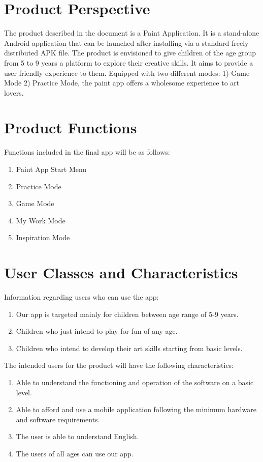 \documentclass{scrreprt}
\begin{document}
\section{Product Perspective}
The product described in the document is a Paint Application. It is a stand-alone Android application that can be launched after installing via a standard freely-distributed APK file.
The product is envisioned to give children of the age group from 5 to 9 years a platform to explore their creative skills. It aims to provide a user friendly experience to them. Equipped with two different modes: 1) Game Mode  2) Practice Mode, the paint app offers a wholesome experience to art lovers. 

\section{Product Functions}
Functions included in the final app will be as follows:
\begin{enumerate}[itemsep=0.5pt]
    \item Paint App Start Menu
    \item Practice Mode
    \item Game Mode
    \item My Work Mode
    \item Inspiration Mode
\end{enumerate}

\section{User Classes and Characteristics}
Information regarding users who can use the app:
    \begin{enumerate}[itemsep=0.5pt]
        \item Our app is targeted mainly for children between age range of 5-9 years.
        \item Children who just intend to play for fun of any age.
        \item Children who intend to develop their art skills starting from basic levels. 
    \end{enumerate}
The intended users for the product will have the following characteristics:
    \begin{enumerate}[itemsep=0.5pt]
        \item Able to understand the functioning and operation of the software on a basic level.
        \item Able to afford and use a mobile application following the minimum hardware and software requirements.
        \item The user is able to understand English.
        \item The users of all ages can use our app.
    \end{enumerate}
\end{document}
